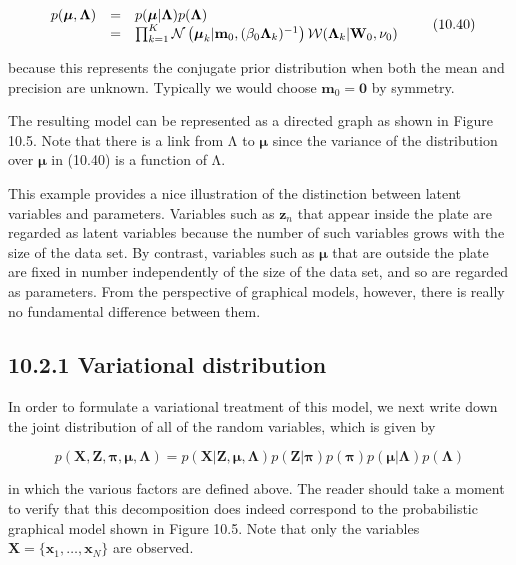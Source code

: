 \documentclass[
  10
]{article}
\begin{document}
\[
\begin{array}{r c l} p (\boldsymbol {\mu}, \boldsymbol {\Lambda}) & = & p (\boldsymbol {\mu} | \boldsymbol {\Lambda}) p (\boldsymbol {\Lambda}) \\ & = & \prod_ {k = 1} ^ {K} \mathcal {N} \left(\boldsymbol {\mu} _ {k} | \mathbf {m} _ {0}, (\beta_ {0} \boldsymbol {\Lambda} _ {k}) ^ {- 1}\right) \mathcal {W} (\boldsymbol {\Lambda} _ {k} | \mathbf {W} _ {0}, \nu_ {0}) \end{array}\tag{10.40}
\]

because this represents the conjugate prior distribution when both the
mean and precision are unknown. Typically we would choose
\(\mathbf { m } _ { 0 } = \mathbf { 0 }\) by symmetry.

The resulting model can be represented as a directed graph as shown in
Figure 10.5. Note that there is a link from Λ to \(\pmb { \mu }\) since
the variance of the distribution over \(\pmb { \mu }\) in (10.40) is a
function of Λ.

This example provides a nice illustration of the distinction between
latent variables and parameters. Variables such as
\(\mathbf { z } _ { n }\) that appear inside the plate are regarded as
latent variables because the number of such variables grows with the
size of the data set. By contrast, variables such as \(\pmb { \mu }\)
that are outside the plate are fixed in number independently of the size
of the data set, and so are regarded as parameters. From the perspective
of graphical models, however, there is really no fundamental difference
between them.

\subsection{10.2.1 Variational
distribution}\label{variational-distribution}

In order to formulate a variational treatment of this model, we next
write down the joint distribution of all of the random variables, which
is given by

\[
p (\mathbf {X}, \mathbf {Z}, \boldsymbol {\pi}, \boldsymbol {\mu}, \boldsymbol {\Lambda}) = p (\mathbf {X} | \mathbf {Z}, \boldsymbol {\mu}, \boldsymbol {\Lambda}) p (\mathbf {Z} | \boldsymbol {\pi}) p (\boldsymbol {\pi}) p (\boldsymbol {\mu} | \boldsymbol {\Lambda}) p (\boldsymbol {\Lambda})\tag{10.41}
\]

in which the various factors are defined above. The reader should take a
moment to verify that this decomposition does indeed correspond to the
probabilistic graphical model shown in Figure 10.5. Note that only the
variables
\(\mathbf { X } = \{ \mathbf { x } _ { 1 } , \ldots , \mathbf { x } _ { N } \}\)
are observed.
\end{document}
